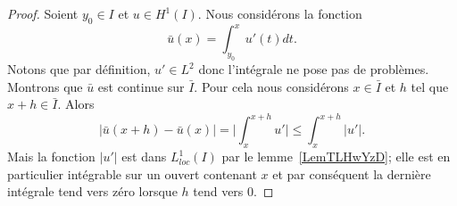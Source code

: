 \begin{proof}
	Soient \( y_0\in I\) et \( u\in H^1(I)\). Nous considérons la fonction
	\begin{equation}
		\bar u(x)=\int_{y_0}^xu'(t)dt.
	\end{equation}
	Notons que par définition, \( u'\in L^2\) donc l'intégrale ne pose pas de problèmes. Montrons que \( \bar u\) est continue sur \( \bar I\). Pour cela nous considérons \( x\in\bar I\) et \( h\) tel que \( x+h\in \bar I\). Alors
	\begin{equation}
		\big| \bar u(x+h)-\bar u(x) \big|=\big| \int_x^{x+h}u' \big|\leq \int_x^{x+h}| u' |.
	\end{equation}
	Mais la fonction \( | u' |\) est dans \( L^1_{loc}(I)\) par le lemme~\ref{LemTLHwYzD}; elle est en particulier intégrable sur un ouvert contenant \( x\) et par conséquent la dernière intégrale tend vers zéro lorsque \( h\) tend vers \( 0\).


\end{proof}
